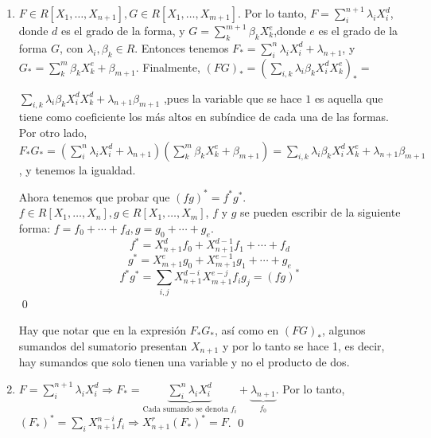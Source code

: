 \begin{Dem}
  \begin{enumerate}
  \item $F\in R[X_1,\dots,X_{n+1}],G\in R[X_1,\dots,X_{m+1}]$. Por lo tanto, $F=\sum_{i}^{n+1} \lambda_iX_i^{d}$, donde $d$ es el grado de la forma, y $G=\sum_{k}^{m+1} \beta_kX_k^{e}$,donde $e$ es el grado de la forma $G$, con $\lambda_i,\beta_k \in R$. Entonces tenemos $F_*=\sum_{i}^{n} \lambda_iX_i^{d}+\lambda_{n+1}$, y $G_*=\sum_{k}^{m} \beta_kX_k^{e}+\beta_{m+1}$. Finalmente, $(FG)_* = (\sum_{i,k}\lambda_i\beta_k X_i^{d}X_k^{e})_* =$

    $\sum_{i,k} \lambda_i\beta_k X_i^{d}X_k^{d} + \lambda_{n+1}\beta_{m+1}$ ,pues la variable que se hace $1$ es aquella que tiene como coeficiente los más altos en subíndice de cada una de las formas. Por otro lado, $F_*G_*= (\sum_{i}^{n} \lambda_iX_i^{d}+\lambda_{n+1})(\sum_{k}^{m} \beta_kX_k^{e}+\beta_{m+1}) =  \sum_{i,k} \lambda_i\beta_k X_i^{d}X_k^{e} + \lambda_{n+1}\beta_{m+1}$, y tenemos la igualdad.

    Ahora tenemos que probar que $(fg)^*=f^*g^*$. $f\in R[X_1,\dots,X_n], g\in R[X_1,\dots,X_m]$, $f$ y $g$ se pueden escribir de la siguiente forma: $f=f_0+\cdots+f_d, g=g_0+\cdots+g_e$.
    $$f^*=X^d_{n+1}f_0+X^{d-1}_{n+1}f_1+\cdots + f_d$$
    $$g^*=X^e_{m+1}g_0+X^{e-1}_{m+1}g_1+\cdots + g_e$$
    $$f^*g^*=\sum_{i,j}X_{n+1}^{d-i}X_{m+1}^{e-j}f_ig_j=(fg)^* $$ \qed
    \begin{nota}
      Hay que notar que en la expresión $F_*G_*$, así como en $(FG)_*$, algunos sumandos del sumatorio presentan $X_{n+1}$ y por lo tanto se hace 1, es decir, hay sumandos que solo tienen una variable y no el producto de dos.
    \end{nota}
  \item $F= \sum_{i}^{n+1} \lambda_iX_i^{d} \Rightarrow F_* =\underbrace{\sum_{i}^{n} \lambda_iX_i^{d}}_{\text{Cada sumando se denota }f_{i}}+\underbrace{\lambda_{n+1}}_{f_{0}} $. Por lo tanto, $(F_*)^*= \sum_iX_{n+1}^{n-i}f_i \Rightarrow X^r_{n+1}(F_*)^*=F$. \qed


\end{enumerate}
\end{Dem}
